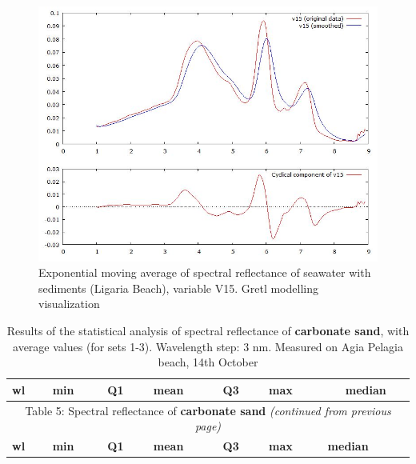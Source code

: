 \documentclass[10pt, a4paper]{article}
\begin{document}
\begin{appendices}
\begin{figure}[H]
\begin{center}
\label{fig:57}
\end{center}
\end{figure}
\begin{figure}[H]
\begin{center}
\includegraphics[scale=0.32]{G-exp-mov-aver.jpg}
\caption{Exponential moving average of spectral reflectance of seawater with sediments (Ligaria Beach), variable V15. Gretl modelling visualization­}
\label{fig:57}
\end{center}
\end{figure}
\pagebreak

\begin{longtable}{|r|r|r|r|r|r|r|}
\caption{Results of the statistical analysis of spectral reflectance of \textbf{carbonate sand}, with average values (for sets 1-3). Wavelength step: 3 nm. Measured on Agia Pelagia beach, 14th October}
\label{tab:17} \\
\hline
  \multicolumn{1}{|l|}{\textbf{wl}} &
   \multicolumn{1}{l|}{\textbf{min}} & 
   \multicolumn{1}{l|}{\textbf{Q1}} & 
   \multicolumn{1}{l|}{\textbf{mean}} & 
   \multicolumn{1}{l|}{\textbf{Q3}} & 
   \multicolumn{1}{l|}{\textbf{max}} & 
   \multicolumn{1}{c|}{\textbf{median}} \\ \hline
\endfirsthead

\multicolumn{7}{c}{Table 5: Spectral reflectance of \textbf{carbonate sand} \textit{(continued from previous page)}}\\
\hline \multicolumn{1}{|l|}{\textbf{wl}} & \multicolumn{1}{l|}{\textbf{min}} & \multicolumn{1}{l|}{\textbf{Q1}} & \multicolumn{1}{l|}{\textbf{mean}} & \multicolumn{1}{l|}{\textbf{Q3}} & \multicolumn{1}{l|}{\textbf{max}} & \multicolumn{1}{l|}{\textbf{median}} \\ \hline
\endhead


\end{longtable}
\end{appendices}
\end{document}
